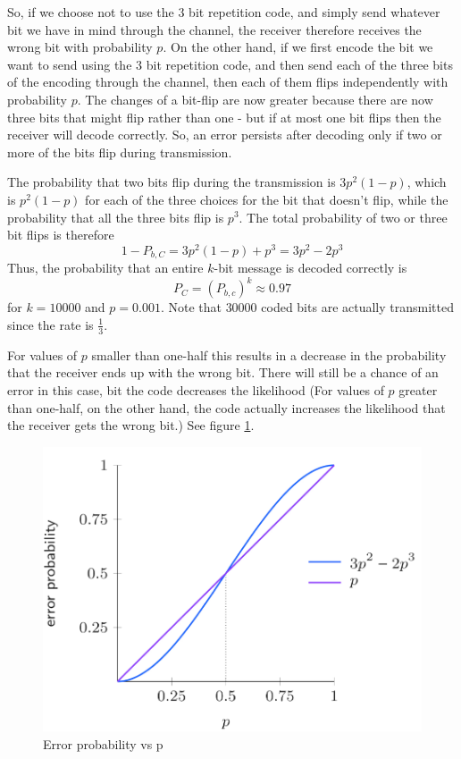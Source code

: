 \documentclass[12pt, oneside]{book}
\theoremstyle{definition}
\theoremstyle{definition}
\theoremstyle{remark}
\begin{document}
So, if we choose  not to use the $3$ bit repetition code, and simply send whatever bit we have in mind through the channel, the receiver therefore receives the wrong bit with probability $p$. On the other hand, if we first encode the bit we want to send using the $3$ bit repetition code, and then send each of the three bits of the encoding through the channel, then each of them flips independently with probability $p$. The changes of a bit-flip are now greater because there are now three bits that might flip rather than one - but if at most one bit flips then the receiver will decode correctly. So, an error persists after decoding only if two or more of the bits flip during transmission.

The probability that two bits flip during the transmission is $3p^2(1-p)$, which is $p^2(1-p)$ for each of the three choices for the bit that doesn't flip, while the probability that all the three bits flip is $p^3$. The total probability of two or three bit flips is therefore
\[
1-P_{b,C}=3p^2(1-p) + p^3 = 3p^2-2p^3
\]
Thus, the probability that an entire $k$-bit message is decoded correctly is
\[
P_C=(P_{b,c})^k\approx 0.97
\]
for $k=10000$ and $p=0.001$. Note that $30000$ coded bits are actually transmitted since the rate is $\frac{1}{3}$.

For values of $p$ smaller than one-half this results in a decrease in the probability that the receiver ends up with the wrong bit. There will still be a chance of an error in this case, bit the code decreases the likelihood (For values of $p$ greater than one-half, on the other hand, the code actually increases the likelihood that the receiver gets the wrong bit.) See figure \ref{fig:errrprob}.
\begin{figure}[ht]
    \centering
    \includegraphics[width=0.75\linewidth]{Images/grapherr.png}
    \caption{Error probability vs p}
    \label{fig:errrprob}
\end{figure}
\end{document}
